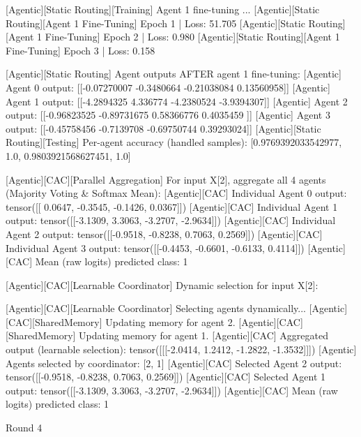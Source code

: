 [Agentic][Static Routing][Training] Agent 1 fine-tuning ...
[Agentic][Static Routing][Agent 1 Fine-Tuning] Epoch 1 | Loss: 51.705
[Agentic][Static Routing][Agent 1 Fine-Tuning] Epoch 2 | Loss: 0.980
[Agentic][Static Routing][Agent 1 Fine-Tuning] Epoch 3 | Loss: 0.158

[Agentic][Static Routing] Agent outputs AFTER agent 1 fine-tuning:
[Agentic] Agent 0 output: [[-0.07270007 -0.3480664  -0.21038084  0.13560958]]
[Agentic] Agent 1 output: [[-4.2894325  4.336774  -4.2380524 -3.9394307]]
[Agentic] Agent 2 output: [[-0.96823525 -0.89731675  0.58366776  0.4035459 ]]
[Agentic] Agent 3 output: [[-0.45758456 -0.7139708  -0.69750744  0.39293024]]
[Agentic][Static Routing][Testing] Per-agent accuracy (handled samples): [0.9769392033542977, 1.0, 0.9803921568627451, 1.0]

[Agentic][CAC][Parallel Aggregation] For input X[2], aggregate all 4 agents (Majority Voting & Softmax Mean):
[Agentic][CAC] Individual Agent 0 output: tensor([[ 0.0647, -0.3545, -0.1426,  0.0367]])
[Agentic][CAC] Individual Agent 1 output: tensor([[-3.1309,  3.3063, -3.2707, -2.9634]])
[Agentic][CAC] Individual Agent 2 output: tensor([[-0.9518, -0.8238,  0.7063,  0.2569]])
[Agentic][CAC] Individual Agent 3 output: tensor([[-0.4453, -0.6601, -0.6133,  0.4114]])
[Agentic][CAC] Mean (raw logits) predicted class: 1

[Agentic][CAC][Learnable Coordinator] Dynamic selection for input X[2]:

[Agentic][CAC][Learnable Coordinator] Selecting agents dynamically...
[Agentic][CAC][SharedMemory] Updating memory for agent 2.
[Agentic][CAC][SharedMemory] Updating memory for agent 1.
[Agentic][CAC] Aggregated output (learnable selection): tensor([[[-2.0414,  1.2412, -1.2822, -1.3532]]])
[Agentic] Agents selected by coordinator: [2, 1]
[Agentic][CAC] Selected Agent 2 output: tensor([[-0.9518, -0.8238,  0.7063,  0.2569]])
[Agentic][CAC] Selected Agent 1 output: tensor([[-3.1309,  3.3063, -3.2707, -2.9634]])
[Agentic][CAC] Mean (raw logits) predicted class: 1

Round 4


